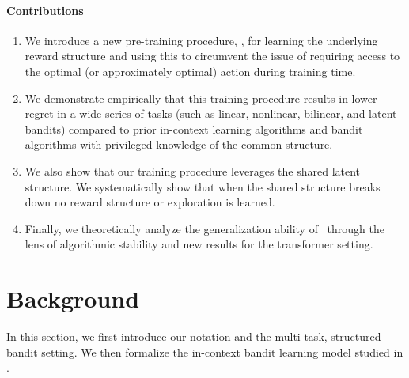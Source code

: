 \documentclass[10pt]{article}
\theoremstyle{plain}
\theoremstyle{definition}
\theoremstyle{remark}
\begin{document}
\paragraph{Contributions}
\begin{enumerate}
    \item We introduce a new pre-training procedure, \pred, for learning the underlying reward structure and using this to circumvent the issue of requiring access to the optimal (or approximately optimal) action during training time.
    \item We demonstrate empirically that this training procedure results in lower regret in a wide series of tasks (such as linear, nonlinear, bilinear, and latent bandits) compared to prior in-context learning algorithms and bandit algorithms with privileged knowledge of the common structure.
    \item We also show that our training procedure leverages the shared latent structure. We systematically show that when the shared structure breaks down no reward structure or exploration is learned.
    \item Finally, we theoretically analyze the generalization ability of \pred\ through the lens of algorithmic stability and new results for the transformer setting.
\end{enumerate}
\section{Background}
\label{sec:prelim}
In this section, we first introduce our notation and the multi-task, structured bandit setting.
We then formalize the in-context bandit learning model studied in \citet{laskin2022context, lee2023supervised, sinii2023context, lin2023transformers, ma2023rethinking, liu2023reason, liu2023self}.
\end{document}
